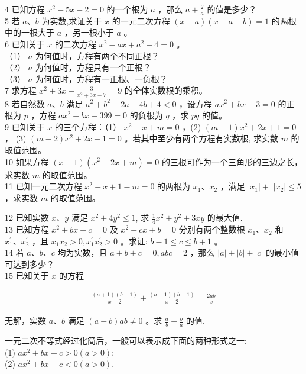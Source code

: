 \documentclass[10pt]{article}
\begin{document}
4 已知方程 $x^{2}-5 x-2=0$ 的一个根为 $a$ ，那么 $a+\frac{2}{a}$ 的值是多少？\\
5 若 $a 、 b$ 为实数,求证关于 $x$ 的一元二次方程 $(x-a)(x-a-b)=1$ 的两根中的一根大于 $a$ ，另一根小于 $a$ 。\\
6 已知关于 $x$ 的二次方程 $x^{2}-a x+a^{2}-4=0$ 。\\
（1） $a$ 为何值时，方程有两个不同正根？\\
（2） $a$ 为何值时，方程只有一个正根？\\
（3） $a$ 为何值时，方程有一正根、一负根？\\
7 求方程 $x^{2}+3 x-\frac{3}{x^{2}+3 x-7}=9$ 的全体实数根的乘积。\\
8 若自然数 $a 、 b$ 满足 $a^{2}+b^{2}-2 a-4 b+4<0$ ，设方程 $a x^{2}+b x-3=0$ 的正根为 $p$ ，方程 $a x^{2}-b x-399=0$ 的负根为 $q$ ，求 $p q$ 的值。\\
9 已知关于 $x$ 的三个方程：（1） $x^{2}-x+m=0$ ，(2) $(m-1) x^{2}+2 x+1=0$ ， (3) $(m-2) x^{2}+2 x-1=0$ 。若其中至少有两个方程有实数根, 求实数 $m$ 的取值范围。\\
10 如果方程 $(x-1)\left(x^{2}-2 x+m\right)=0$ 的三根可作为一个三角形的三边之长，求实数 $m$ 的取值范围。\\
11 已知一元二次方程 $x^{2}-x+1-m=0$ 的两根为 $x_{1} 、 x_{2}$ ，满足 $\left|x_{1}\right|+$ $\left|x_{2}\right| \leqslant 5$ ，求实数 $m$ 的取值范围。

12 已知实数 $x 、 y$ 满足 $x^{2}+4 y^{2} \leqslant 1$, 求 $\frac{1}{4} x^{2}+y^{2}+3 x y$ 的最大值.\\
13 已知方程 $x^{2}+b x+c=0$ 及 $x^{2}+c x+b=0$ 分别有两个整数根 $x_{1} 、 x_{2}$ 和 $x_{1}^{\prime} 、 x_{2}^{\prime}$ ，且 $x_{1} x_{2}>0, x_{1}^{\prime} x_{2}^{\prime}>0$ 。求证: $b-1 \leqslant c \leqslant b+1$ 。\\
14 若 $a 、 b 、 c$ 均为实数，且 $a+b+c=0, a b c=2$ ，那么 $|a|+|b|+|c|$ 的最小值可达到多少？\\
15 已知关于 $x$ 的方程

\begin{align*}
\frac{(a+1)(b+1)}{x+2}+\frac{(a-1)(b-1)}{x-2}=\frac{2 a b}{x}
\end{align*}

无解，实数 $a 、 b$ 满足 $(a-b) a b \neq 0$ 。求 $\frac{a}{b}+\frac{b}{a}$ 的值.

一元二次不等式经过化简后，一般可以表示成下面的两种形式之一:\\
(1) $a x^{2}+b x+c>0(a>0)$;\\
(2) $a x^{2}+b x+c<0(a>0)$.
\end{document}
